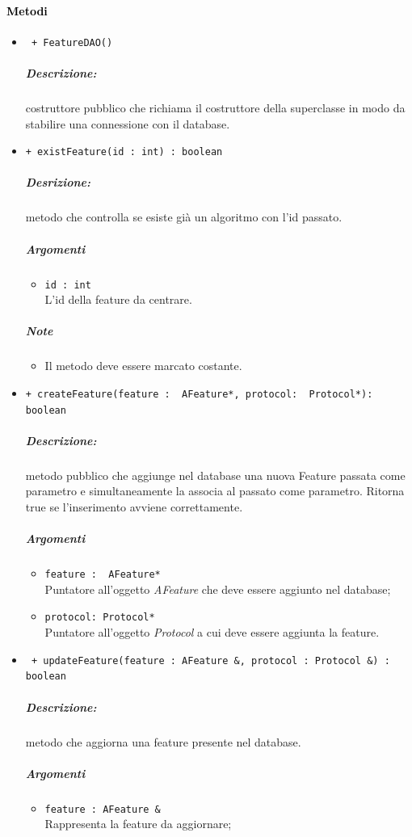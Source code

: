 \paragraph{\textcolor{black}{Metodi\\}}
	\begin{itemize}
		\item \color{blue}\verb! + FeatureDAO()!\\
		\color{black}
		\subparagraph{Descrizione:} costruttore pubblico che richiama il costruttore della superclasse in modo da stabilire una connessione con il database.
		
		\item \color{blue}\verb!+ existFeature(id : int) : boolean!\\
		\color{black}
		\subparagraph{Desrizione:} metodo che controlla se esiste già un algoritmo con l'id passato.
		\subparagraph{Argomenti}
			\begin{itemize}
				\item \color{blue}\verb!id : int!\\
				\color{black}L'id della feature da centrare.
			\end{itemize}
		\subparagraph{Note}
			\begin{itemize}
				\item Il metodo deve essere marcato costante.
			\end{itemize}
			
		\item \color{blue}\verb!+ createFeature(feature :  AFeature*, protocol:  Protocol*): boolean!\\
		\color{black}
		\subparagraph{Descrizione:} metodo pubblico che aggiunge nel database una nuova Feature\g{} passata come parametro e simultaneamente la associa al \protocol{} passato come parametro. Ritorna true se l'inserimento avviene correttamente.
		\subparagraph{Argomenti}
			\begin{itemize}
				\item\color{RoyalPurple} \verb!feature :  AFeature*! \\ 
				\color{black}Puntatore all'oggetto \textsl{AFeature} che deve essere aggiunto nel database;
				
				\item \verb!protocol: Protocol*! \\ 
				\color{black}Puntatore all'oggetto \textsl{Protocol} a cui deve essere aggiunta la feature\g{}.
			\end{itemize}
			
		\item \color{blue}\verb! + updateFeature(feature : AFeature &, protocol : Protocol &) : boolean!\\
		\color{black}
		\subparagraph{Descrizione:} metodo che aggiorna una feature\g{} presente nel database.
		\subparagraph{Argomenti}
			\begin{itemize}
				\item \color{RoyalPurple}\verb!feature : AFeature &!\\
				\color{black}Rappresenta la feature\g{} da aggiornare;
				

\end{itemize}
\end{itemize}
